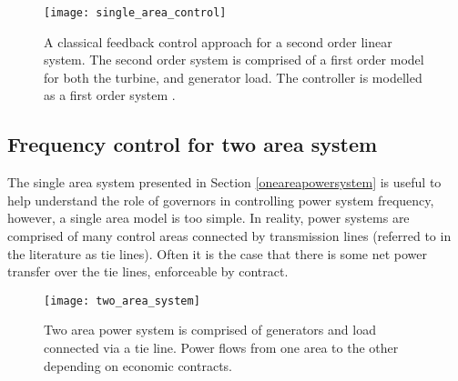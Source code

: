 \begin{figure}[ht]
\centering
\texttt{[image: single\_area\_control]}
\caption{A classical feedback control approach for a second order linear system. The second order system is comprised of a first order model for both the turbine, and generator load. The controller is modelled as a first order system \cite{Kothari2011}.}
\label{fig:singleareacontrol}
\end{figure}


\subsection{Frequency control for two area system}
The single area system presented in Section \ref{oneareapowersystem} is useful to help understand the role of governors in controlling power system frequency, however, a single area model is too simple. In reality, power systems are comprised of many control areas connected by transmission lines (referred to in the literature as tie lines). Often it is the case that there is some net power transfer over the tie lines, enforceable by contract.

\begin{figure}[ht]
	\centering
	\texttt{[image: two\_area\_system]}
	\caption{Two area power system is comprised of generators and load connected via a tie line. Power flows from one area to the other depending on economic contracts.}
	\label{fig:twoareapower}
\end{figure}

